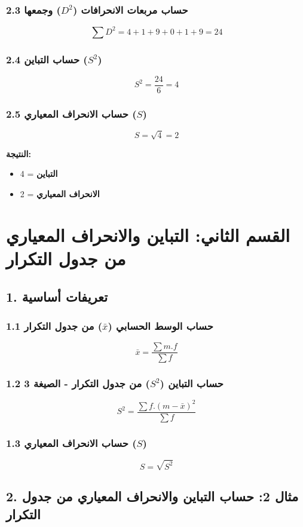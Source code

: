 \documentclass{article}
\begin{document}
\subsubsection{2.3 حساب مربعات الانحرافات ($D^2$) وجمعها}
$$
∑D^2 = 4 + 1 + 9 + 0 + 1 + 9 = 24
$$

\subsubsection{2.4 حساب التباين ($S^2$)}
$$
S^2 = \frac{24}{6} = 4
$$

\subsubsection{2.5 حساب الانحراف المعياري ($S$)}
$$
S = \sqrt{4} = 2
$$

\textbf{النتيجة:}

\begin{itemize}
\item \textbf{التباين} = 4
\item \textbf{الانحراف المعياري} = 2
\end{itemize}

\section{القسم الثاني: التباين والانحراف المعياري من جدول التكرار}

\subsection{1. تعريفات أساسية}

\subsubsection{1.1 حساب الوسط الحسابي ($\bar{x}$) من جدول التكرار}
$$
\bar{x} = \frac{∑m.f}{∑f}
$$

\subsubsection{1.2 حساب التباين ($S^2$) من جدول التكرار - \textbf{الصيغة 3}}
$$
S^2 = \frac{∑f.(m - \bar{x})^2}{∑f}
$$

\subsubsection{1.3 حساب الانحراف المعياري ($S$)}
$$
S = \sqrt{S^2}
$$

\subsection{2. مثال 2: حساب التباين والانحراف المعياري من جدول التكرار}
\end{document}
